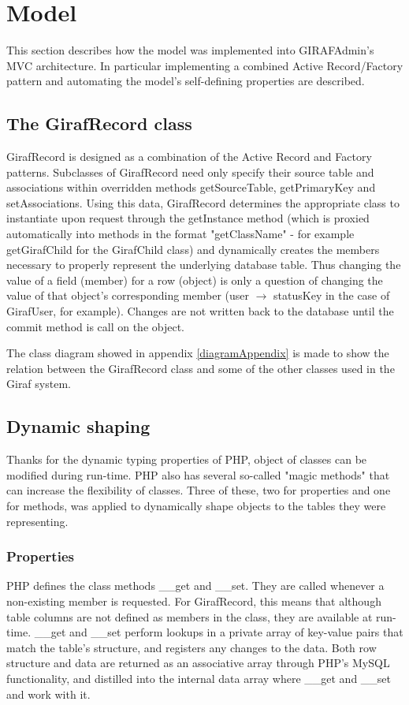 \section{Model}
\label{model}
This section describes how the model was implemented into GIRAFAdmin's MVC architecture. In particular implementing a combined Active Record/Factory pattern and automating the model's self-defining properties are described.

\subsection{The GirafRecord class}
GirafRecord is designed as a combination of the Active Record and Factory patterns. Subclasses of GirafRecord need only specify their source table and associations within overridden methods getSourceTable, getPrimaryKey and setAssociations. Using this data, GirafRecord determines the appropriate class to instantiate upon request through the getInstance method (which is proxied automatically into methods in the format "getClassName" - for example getGirafChild for the GirafChild class) and dynamically creates the members necessary to properly represent the underlying database table. Thus changing the value of a field (member) for a row (object) is only a question of changing the value of that object's corresponding member (user $\rightarrow$ statusKey in the case of GirafUser, for example). Changes are not written back to the database until the commit method is call on the object.

The class diagram showed in appendix \ref{diagramAppendix} is made to show the relation between the GirafRecord class and some of the other classes used in the Giraf system.

\subsection{Dynamic shaping}
Thanks for the dynamic typing properties of PHP, object of classes can be modified during run-time. PHP also has several so-called "magic methods" that can increase the flexibility of classes. Three of these, two for properties and one for methods, was applied to dynamically shape objects to the tables they were representing.

\subsubsection*{Properties}
PHP defines the class methods \_\_get and \_\_set. They are called whenever a non-existing member is requested. For GirafRecord, this means that although table columns are not defined as members in the class, they are available at run-time. \_\_get and \_\_set perform lookups in a private array of key-value pairs that match the table's structure, and registers any changes to the data.
Both row structure and data are returned as an associative array through PHP's MySQL functionality, and distilled into the internal data array where \_\_get and \_\_set and work with it.

